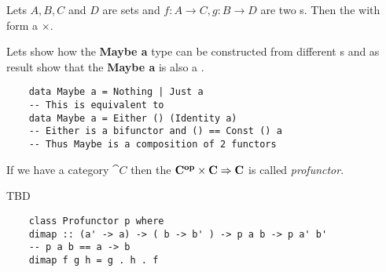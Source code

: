 \begin{example}
  \label{ex:product_bifunctor}
  Lets $A,B,C$ and $D$ are sets and $f: A \to C, g: B \to D$ are two
  s. Then the 
  with  form a
   $\times$.
\end{example}

\begin{example}
  \label{ex:maybe_functor}
  Lets show how the \textbf{Maybe a} type can be
  constructed from different 
  s and as result show that the
  \textbf{Maybe a} is also a
  . 
  \begin{verbatim}
    data Maybe a = Nothing | Just a
    -- This is equivalent to
    data Maybe a = Either () (Identity a)
    -- Either is a bifunctor and () == Const () a 
    -- Thus Maybe is a composition of 2 functors 
  \end{verbatim}
\end{example}

\begin{definition}[Profunctor]
  \label{def:profunctor}
  If we have a category $\cat{C}$ then the 
  $\mathbf{C^{op}} \times \mathbf{C} \Rightarrow \mathbf{C}$ is called
  \textit{profunctor}. 
\end{definition}

\begin{example}
  \label{ex:contravariant_functor_hask}
  TBD
  \begin{verbatim}
    class Profunctor p where
    dimap :: (a' -> a) -> ( b -> b' ) -> p a b -> p a' b'
    -- p a b == a -> b
    dimap f g h = g . h . f
  \end{verbatim}
\end{example}





